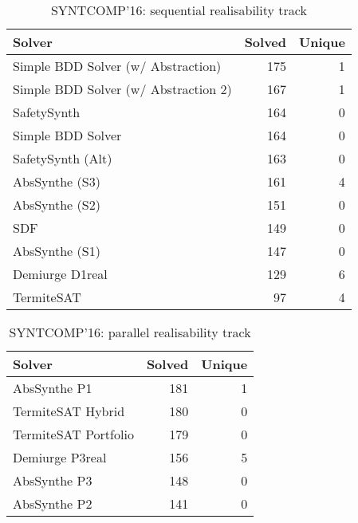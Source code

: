 \begin{table}
    \centering
    \begin{tabular}{l r r}
        \textbf{Solver} & \textbf{Solved} & \textbf{Unique} \\
        \hline
        Simple BDD Solver (w/ Abstraction) & 175 & 1 \\
        Simple BDD Solver (w/ Abstraction 2) & 167 & 1 \\
        SafetySynth & 164 & 0 \\
        Simple BDD Solver & 164 & 0 \\
        SafetySynth (Alt) & 163 & 0 \\
        AbsSynthe (S3) & 161 & 4 \\
        AbsSynthe (S2) & 151 & 0 \\
        SDF & 149 & 0 \\
        AbsSynthe (S1) & 147 & 0 \\
        Demiurge D1real & 129 & 6 \\
        TermiteSAT & 97 & 4 \\
    \end{tabular}
    \caption{SYNTCOMP'16: sequential realisability track}
    \label{table:syntcomp16s}
\end{table}

\begin{table}
    \centering
    \begin{tabular}{l r r}
        \textbf{Solver} & \textbf{Solved} & \textbf{Unique} \\
        \hline
        AbsSynthe P1 & 181 & 1 \\
        TermiteSAT Hybrid & 180 & 0 \\
        TermiteSAT Portfolio & 179 & 0 \\
        Demiurge P3real & 156 & 5 \\
        AbsSynthe P3 & 148 & 0 \\
        AbsSynthe P2 & 141 & 0 \\
    \end{tabular}
    \caption{SYNTCOMP'16: parallel realisability track}
    \label{table:syntcomp16p}
\end{table}


